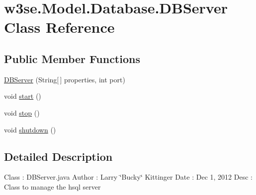 \hypertarget{classw3se_1_1_model_1_1_database_1_1_d_b_server}{\section{w3se.\-Model.\-Database.\-D\-B\-Server Class Reference}
\label{classw3se_1_1_model_1_1_database_1_1_d_b_server}
}
\subsection*{Public Member Functions}
\begin{DoxyCompactItemize}
\item 
\hyperlink{classw3se_1_1_model_1_1_database_1_1_d_b_server_a524b0569e3c8377608ec1ec60412039d}{D\-B\-Server} (String\mbox{[}$\,$\mbox{]} properties, int port)
\item 
void \hyperlink{classw3se_1_1_model_1_1_database_1_1_d_b_server_ab13e64657ef8525ed275dbbd5fcb0bb0}{start} ()
\item 
void \hyperlink{classw3se_1_1_model_1_1_database_1_1_d_b_server_ac7372a46a4f00652c61790961f075fe3}{stop} ()
\item 
void \hyperlink{classw3se_1_1_model_1_1_database_1_1_d_b_server_ab5c113fcfba0d78c192240057fb98200}{shutdown} ()
\end{DoxyCompactItemize}


\subsection{Detailed Description}
Class \-: D\-B\-Server.\-java Author \-: Larry \char`\"{}\-Bucky\char`\"{} Kittinger Date \-: Dec 1, 2012 Desc \-: Class to manage the hsql server 

